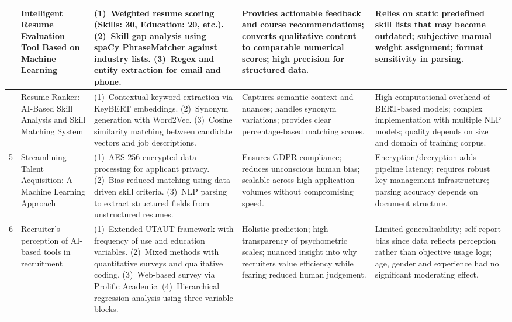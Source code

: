 \documentclass[12pt,a4paper]{report}
\begin{document}
\begin{longtable}{|>{\centering\arraybackslash}p{0.6cm}|p{3.1cm}|p{3.6cm}|p{3.2cm}|p{3.2cm}|}
3 &
Intelligent Resume Evaluation Tool Based on Machine Learning \cite{ref3} &
(1)~Weighted resume scoring (Skills: 30, Education: 20, etc.). (2)~Skill gap analysis using spaCy PhraseMatcher against industry lists. (3)~Regex and entity extraction for email and phone. &
Provides actionable feedback and course recommendations; converts qualitative content to comparable numerical scores; high precision for structured data. &
Relies on static predefined skill lists that may become outdated; subjective manual weight assignment; format sensitivity in parsing. \\
\hline

4 &
Resume Ranker: AI-Based Skill Analysis and Skill Matching System \cite{ref4} &
(1)~Contextual keyword extraction via KeyBERT embeddings. (2)~Synonym generation with Word2Vec. (3)~Cosine similarity matching between candidate vectors and job descriptions. &
Captures semantic context and nuances; handles synonym variations; provides clear percentage-based matching scores. &
High computational overhead of BERT-based models; complex implementation with multiple NLP models; quality depends on size and domain of training corpus. \\
\hline

5 &
Streamlining Talent Acquisition: A Machine Learning Approach \cite{ref5} &
(1)~AES-256 encrypted data processing for applicant privacy. (2)~Bias-reduced matching using data-driven skill criteria. (3)~NLP parsing to extract structured fields from unstructured resumes. &
Ensures GDPR compliance; reduces unconscious human bias; scalable across high application volumes without compromising speed. &
Encryption/decryption adds pipeline latency; requires robust key management infrastructure; parsing accuracy depends on document structure. \\
\hline

6 &
Recruiter's perception of AI-based tools in recruitment \cite{ref6} &
(1)~Extended UTAUT framework with frequency of use and education variables. (2)~Mixed methods with quantitative surveys and qualitative coding. (3)~Web-based survey via Prolific Academic. (4)~Hierarchical regression analysis using three variable blocks. &
Holistic prediction; high transparency of psychometric scales; nuanced insight into why recruiters value efficiency while fearing reduced human judgement. &
Limited generalisability; self-report bias since data reflects perception rather than objective usage logs; age, gender and experience had no significant moderating effect. \\
\hline


\end{longtable}
\end{document}
